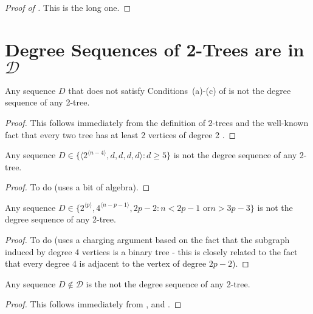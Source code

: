 \documentclass[lotsofwhite,charterfonts]{patmorin}
\newcommand{\rep}[1]{^{\langle#1\rangle}}
\begin{document}
\begin{proof}[Proof of ]
This is the long one.
\end{proof}


\section{Degree Sequences of 2-Trees are in $\mathcal{D}$}

\begin{lem}
Any sequence $D$ that does not satisfy Conditions~(a)-(c) of
 is not the degree sequence of any 2-tree.
\end{lem}

\begin{proof}
This follows immediately from the definition of 2-trees and the
well-known fact that every two tree has at least 2 vertices of degree
2 \cite{X}.
\end{proof}

\begin{lem}
Any sequence $D\in\{\langle 2\rep{n-4},d,d,d,d\rangle : d\ge 5\}$ is not 
the degree sequence of any 2-tree.
\end{lem}

\begin{proof}
To do (uses a bit of algebra).
\end{proof}


\begin{lem}
Any sequence $D\in\{2\rep{p},4\rep{n-p-1}, 2p-2 : \mbox{$n < 2p-1$ or
$n > 3p-3$} \}$ is not the degree sequence of any 2-tree.
\end{lem}

\begin{proof}
To do (uses a charging argument based on the fact that the subgraph
induced by degree 4 vertices is a binary tree - this is closely
related to the fact that every degree 4 is adjacent to the vertex of
degree $2p-2$).
\end{proof}

\begin{lem}
Any sequence $D\not\in \mathcal{D}$ is the not the degree sequence of
any 2-tree.
\end{lem}

\begin{proof}
This follows immediately from ,  and
.
\end{proof}
\end{document}
